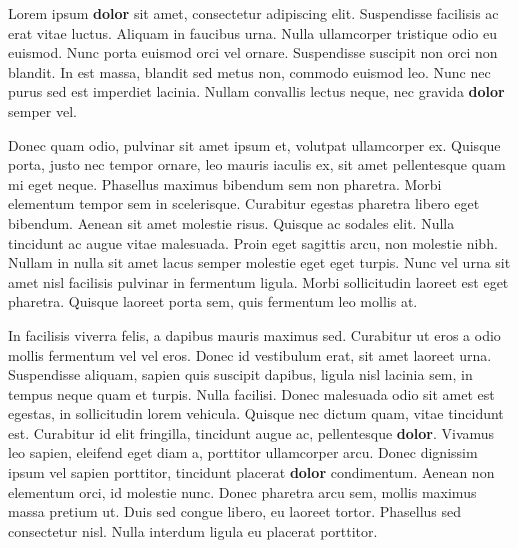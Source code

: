 Lorem ipsum \textbf{dolor} sit amet, consectetur adipiscing elit. Suspendisse facilisis ac erat vitae luctus. Aliquam in faucibus urna. Nulla ullamcorper tristique odio eu euismod. Nunc porta euismod orci vel ornare. Suspendisse suscipit non orci non blandit. In est massa, blandit sed metus non, commodo euismod leo. Nunc nec purus sed est imperdiet lacinia. Nullam convallis lectus neque, nec gravida \textbf{dolor} semper vel.

Donec quam odio, pulvinar sit amet ipsum et, volutpat ullamcorper ex. Quisque porta, justo nec tempor ornare, leo mauris iaculis ex, sit amet pellentesque quam mi eget neque. Phasellus maximus bibendum sem non pharetra. Morbi elementum tempor sem in scelerisque. Curabitur egestas pharetra libero eget bibendum. Aenean sit amet molestie risus. Quisque ac sodales elit. Nulla tincidunt ac augue vitae malesuada. Proin eget sagittis arcu, non molestie nibh. Nullam in nulla sit amet lacus semper molestie eget eget turpis. Nunc vel urna sit amet nisl facilisis pulvinar in fermentum ligula. Morbi sollicitudin laoreet est eget pharetra. Quisque laoreet porta sem, quis fermentum leo mollis at.

In facilisis viverra felis, a dapibus mauris maximus sed. Curabitur ut eros a odio mollis fermentum vel vel eros. Donec id vestibulum erat, sit amet laoreet urna. Suspendisse aliquam, sapien quis suscipit dapibus, ligula nisl lacinia sem, in tempus neque quam et turpis. Nulla facilisi. Donec malesuada odio sit amet est egestas, in sollicitudin lorem vehicula. Quisque nec dictum quam, vitae tincidunt est. Curabitur id elit fringilla, tincidunt augue ac, pellentesque \textbf{dolor}. Vivamus leo sapien, eleifend eget diam a, porttitor ullamcorper arcu. Donec dignissim ipsum vel sapien porttitor, tincidunt placerat \textbf{dolor} condimentum. Aenean non elementum orci, id molestie nunc. Donec pharetra arcu sem, mollis maximus massa pretium ut. Duis sed congue libero, eu laoreet tortor. Phasellus sed consectetur nisl. Nulla interdum ligula eu placerat porttitor.